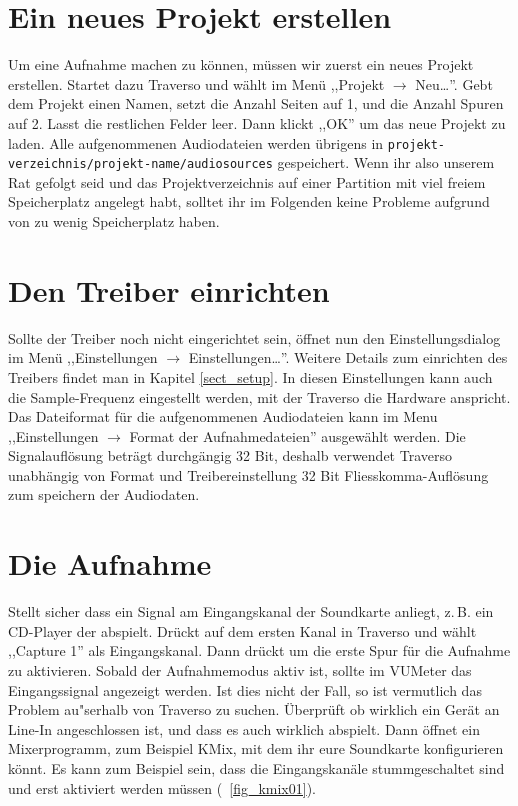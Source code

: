 \section{Ein neues Projekt erstellen}
Um eine Aufnahme machen zu können, müssen wir zuerst ein neues Projekt erstellen. Startet dazu Traverso und wählt im Menü ,,Projekt $\rightarrow$ Neu\dots''. Gebt dem Projekt einen Namen, setzt die Anzahl Seiten auf 1, und die Anzahl Spuren auf 2. Lasst die restlichen Felder leer. Dann klickt ,,OK'' um das neue Projekt zu laden. Alle aufgenommenen Audiodateien werden übrigens in \texttt{projekt-verzeichnis/projekt-name/audiosources} gespeichert. Wenn ihr also unserem Rat gefolgt seid und das Projektverzeichnis auf einer Partition mit viel freiem Speicherplatz angelegt habt, solltet ihr im Folgenden keine Probleme aufgrund von zu wenig Speicherplatz haben.

\section{Den Treiber einrichten}
Sollte der Treiber noch nicht eingerichtet sein, öffnet nun den Einstellungsdialog im Menü ,,Einstellungen $\rightarrow$ Einstellungen\dots''. Weitere Details zum einrichten des Treibers findet man in Kapitel \ref{sect_setup}. In diesen Einstellungen kann auch die Sample-Frequenz eingestellt werden, mit der Traverso die Hardware anspricht. Das Dateiformat für die aufgenommenen Audiodateien kann im Menu ,,Einstellungen $\rightarrow$ Format der Aufnahmedateien'' ausgewählt werden. Die Signalauflösung beträgt durchgängig 32 Bit, deshalb verwendet Traverso unabhängig von Format und Treibereinstellung 32 Bit Fliesskomma-Auflösung zum speichern der Audiodaten.

\section{Die Aufnahme}
Stellt sicher dass ein Signal am Eingangskanal der Soundkarte anliegt, z.\,B. ein CD-Player der abspielt. Drückt  auf dem ersten Kanal in Traverso und wählt ,,Capture 1'' als Eingangskanal. Dann drückt  um die erste Spur für die Aufnahme zu aktivieren. Sobald der Aufnahmemodus aktiv ist, sollte im VUMeter das Eingangssignal angezeigt werden. Ist dies nicht der Fall, so ist vermutlich das Problem au"serhalb von Traverso zu suchen. Überprüft ob wirklich ein Gerät an Line-In angeschlossen ist, und dass es auch wirklich abspielt. Dann öffnet ein Mixerprogramm, zum Beispiel KMix, mit dem ihr eure Soundkarte konfigurieren könnt. Es kann zum Beispiel sein, dass die Eingangskanäle stummgeschaltet sind und erst aktiviert werden müssen (\FigB\ \ref{fig_kmix01}).

